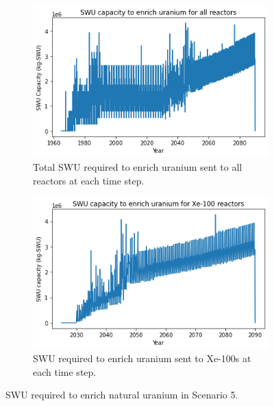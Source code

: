\documentclass[preprint]{elsarticle}
\providecommand{\DIFaddbeginFL}{} %
\providecommand{\DIFaddendFL}{} %
\providecommand{\DIFdelbeginFL}{} %
\providecommand{\DIFdelendFL}{} %
\begin{document}
\begin{figure}
    \centering
    \begin{subfigure}{0.5\textwidth}
        \centering
        \DIFdelbeginFL %
\DIFdelendFL \DIFaddbeginFL \includegraphics[scale=0.5]{../figures/totalswu_scenarios_5.png}
        \DIFaddendFL \caption{Total \gls{SWU} required to enrich uranium sent to all reactors at each time step.}
        \label{fig:totalswu_5}
    \end{subfigure}
    \hspace{0.8cm}
    \begin{subfigure}{0.5\textwidth}
        \centering
        \DIFdelbeginFL %
\DIFdelendFL \DIFaddbeginFL \includegraphics[scale=0.5]{../figures/haleuSWU_scenarios_5.png}
        \DIFaddendFL \caption{\gls{SWU} required to enrich uranium sent to Xe-100s at each time step.}
        \label{fig:haleuswu_5}
    \end{subfigure}
    \caption{\gls{SWU} required to enrich natural uranium in Scenario 5.}
    \label{fig:swu_5}
\end{figure}
\end{document}
